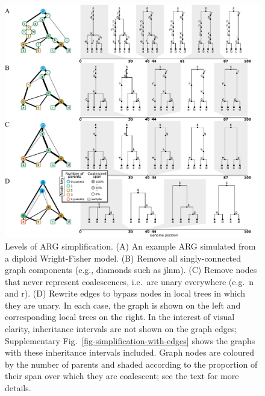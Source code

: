\documentclass{article}
\newcommand{\noderef}[1]{\textsf{#1}}
\begin{document}
\begin{figure}
\centering
\includegraphics[width=\textwidth]{illustrations/simplification}
\caption{\label{fig-simplification}
Levels of ARG simplification.
(A) An example ARG simulated from a diploid Wright-Fisher model.
(B) Remove all
singly-connected graph components (e.g., diamonds such as \noderef{jlnm}).
(C) Remove nodes that never represent coalescences,
i.e.\ are unary everywhere (e.g.\ \noderef{n} and \noderef{r}).
(D) Rewrite edges to bypass nodes in local trees in which they are unary.
In each case, the graph is shown on the left
and corresponding local trees on the right.
In the interest of visual clarity, inheritance intervals are not shown
on the graph edges; Supplementary Fig.~\ref{fig-simplification-with-edges}
shows the graphs with these inheritance intervals included.
Graph nodes are coloured by the number of parents and shaded
according to the proportion of their span over which they are coalescent;
see the text for more details.
}
\end{figure}
\end{document}
